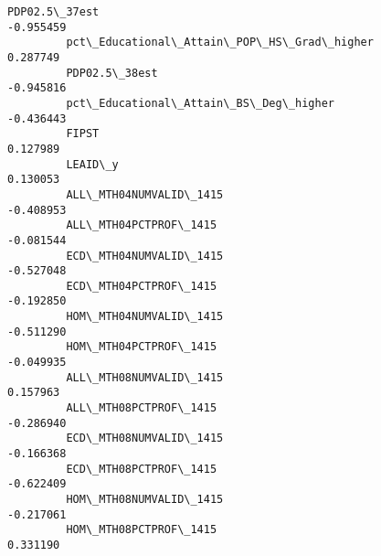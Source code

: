 \documentclass[11pt]{article}
\begin{document}
\begin{Verbatim}[commandchars=\\\{\}]
         PDP02.5\_37est                                                   -0.955459   
         pct\_Educational\_Attain\_POP\_HS\_Grad\_higher                        0.287749   
         PDP02.5\_38est                                                   -0.945816   
         pct\_Educational\_Attain\_BS\_Deg\_higher                            -0.436443   
         FIPST                                                            0.127989   
         LEAID\_y                                                          0.130053   
         ALL\_MTH04NUMVALID\_1415                                          -0.408953   
         ALL\_MTH04PCTPROF\_1415                                           -0.081544   
         ECD\_MTH04NUMVALID\_1415                                          -0.527048   
         ECD\_MTH04PCTPROF\_1415                                           -0.192850   
         HOM\_MTH04NUMVALID\_1415                                          -0.511290   
         HOM\_MTH04PCTPROF\_1415                                           -0.049935   
         ALL\_MTH08NUMVALID\_1415                                           0.157963   
         ALL\_MTH08PCTPROF\_1415                                           -0.286940   
         ECD\_MTH08NUMVALID\_1415                                          -0.166368   
         ECD\_MTH08PCTPROF\_1415                                           -0.622409   
         HOM\_MTH08NUMVALID\_1415                                          -0.217061   
         HOM\_MTH08PCTPROF\_1415                                            0.331190   
         

\end{Verbatim}
\end{document}
